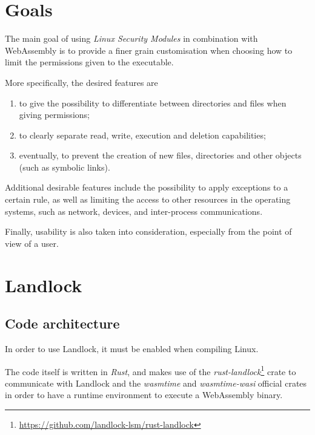 \section{Goals}

The main goal of using \textit{Linux Security Modules} in combination with WebAssembly
is to provide a finer grain customisation when choosing how to limit the permissions given
to the executable.

More specifically, the desired features are
\begin{enumerate}
  \item to give the possibility to differentiate between directories and files when giving permissions;
  \item to clearly separate read, write, execution and deletion capabilities;
  \item eventually, to prevent the creation of new files, directories and other objects (such as symbolic links).
\end{enumerate}

Additional desirable features include the possibility to apply exceptions to a certain rule, as well
as limiting the access to other resources in the operating systems, such as network, devices, and
inter-process communications.

Finally, usability is also taken into consideration, especially from the point of view of a user.

\section{Landlock}

\subsection{Code architecture}

In order to use Landlock, it must be enabled when compiling Linux.

The code itself is written in \textit{Rust}, and makes use of the
\textit{rust-landlock}\footnote{\url{https://github.com/landlock-lsm/rust-landlock}} crate
to communicate with Landlock and the \textit{wasmtime} and \textit{wasmtime-wasi} official
crates in order to have a runtime environment to execute a WebAssembly binary.

